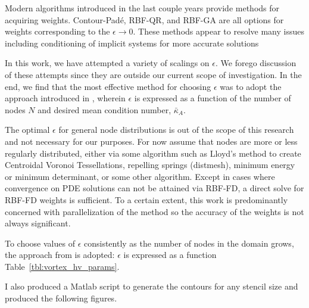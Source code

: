 \documentclass[11pt]{report}
\begin{document}
{Modern algorithms introduced in the last couple years provide methods for acquiring weights. Contour-Pad\'{e}, RBF-QR, and RBF-GA are all options for weights corresponding to the $\epsilon \rightarrow 0$. These methods appear to resolve many issues including conditioning of implicit systems for more accurate solutions \cite{Davydov2011}  \cite{Fornberg2013} 

In this work, we have attempted a variety of scalings on $\epsilon$. We forego discussion of these attempts since they are outside our current scope of investigation. In the end, we find that the most effective method for choosing $\epsilon$ was to adopt the approach introduced in \cite{FlyerLehto11}, wherein $\epsilon$ is expressed as a function of the number of nodes $N$ and desired mean condition number, $\bar{\kappa}_A$. 


The optimal $\epsilon$ for general node distributions is out of the scope of this research and not necessary for our purposes. For now assume that nodes are more or less regularly distributed, either via some algorithm such as Lloyd's method to create Centroidal Voronoi Tessellations, repelling springs (distmesh), minimum energy or minimum determinant, or some other algorithm. Except in cases where convergence on PDE solutions can not be attained via RBF-FD, a direct solve for RBF-FD weights is sufficient. To a certain extent, this work is predominantly concerned with parallelization of the method so the accuracy of the weights is not always significant.

To choose values of $\epsilon$ consistently as the number of nodes in the domain grows, the approach from \cite{FlyerLehto11} is adopted: $\epsilon$ is expressed as a function Table~\ref{tbl:vortex_hv_params}. 

I also produced a Matlab script to generate the contours for any stencil size and produced the following figures. 

}
\end{document}
